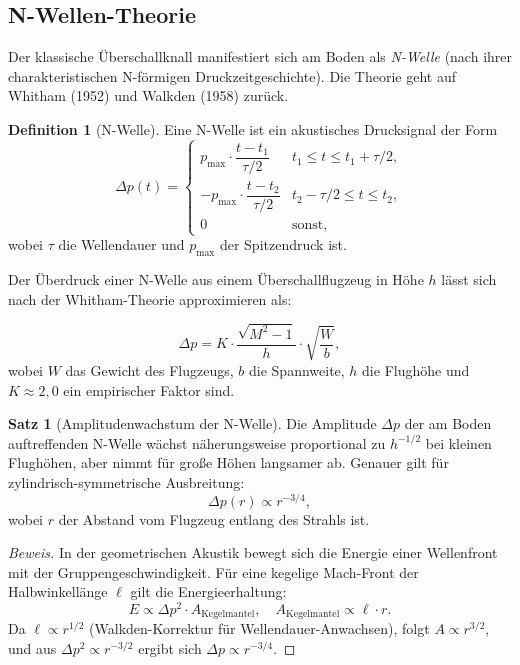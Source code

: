 ﻿\documentclass[12pt,a4paper]{article}
\theoremstyle{definition}
\newtheorem{definition}{Definition}[section]
\newtheorem{satz}{Satz}[section]
\theoremstyle{remark}
\newenvironment{beweis}{\begin{proof}[Beweis]}{\end{proof}}
\begin{document}
\subsection{N-Wellen-Theorie}

Der klassische Überschallknall manifestiert sich am Boden als \emph{N-Welle} (nach ihrer
charakteristischen N-förmigen Druckzeitgeschichte). Die Theorie geht auf Whitham (1952)
und Walkden (1958) zurück.

\begin{definition}[N-Welle]
  Eine N-Welle ist ein akustisches Drucksignal der Form
  \begin{equation}
    \Delta p(t) =
    \begin{cases}
      p_{\max} \cdot \dfrac{t - t_1}{\tau/2} & t_1 \le t \le t_1 + \tau/2, \\[6pt]
      -p_{\max} \cdot \dfrac{t - t_2}{\tau/2} & t_2 - \tau/2 \le t \le t_2, \\[6pt]
      0 & \text{sonst},
    \end{cases}
    \label{eq:n_welle}
  \end{equation}
  wobei $\tau$ die Wellendauer und $p_{\max}$ der Spitzendruck ist.
\end{definition}

Der Überdruck einer N-Welle aus einem Überschallflugzeug in Höhe $h$ lässt sich nach
der Whitham-Theorie approximieren als:

\begin{equation}
  \Delta p = K \cdot \frac{\sqrt{M^2 - 1}}{h} \cdot \sqrt{\frac{W}{b}},
  \label{eq:whitham_druck}
\end{equation}
wobei $W$ das Gewicht des Flugzeugs, $b$ die Spannweite, $h$ die Flughöhe und $K \approx 2{,}0$
ein empirischer Faktor sind.

\begin{satz}[Amplitudenwachstum der N-Welle]
  \label{satz:amplitude}
  Die Amplitude $\Delta p$ der am Boden auftreffenden N-Welle wächst näherungsweise
  proportional zu $h^{-1/2}$ bei kleinen Flughöhen, aber nimmt für große Höhen langsamer ab.
  Genauer gilt für zylindrisch-symmetrische Ausbreitung:
  \begin{equation}
    \Delta p(r) \propto r^{-3/4},
  \end{equation}
  wobei $r$ der Abstand vom Flugzeug entlang des Strahls ist.
\end{satz}

\begin{beweis}
  In der geometrischen Akustik bewegt sich die Energie einer Wellenfront mit der Gruppengeschwindigkeit.
  Für eine kegelige Mach-Front der Halbwinkellänge $\ell$ gilt die Energieerhaltung:
  \begin{equation}
    E \propto \Delta p^2 \cdot A_\text{Kegelmantel}, \quad A_\text{Kegelmantel} \propto \ell \cdot r.
  \end{equation}
  Da $\ell \propto r^{1/2}$ (Walkden-Korrektur für Wellendauer-Anwachsen), folgt
  $A \propto r^{3/2}$, und aus $\Delta p^2 \propto r^{-3/2}$ ergibt sich
  $\Delta p \propto r^{-3/4}$.
\end{beweis}
\end{document}
